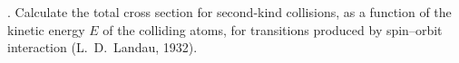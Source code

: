 . Calculate the total cross section for second-kind collisions, as a function of the kinetic energy $E$ of the colliding atoms, for transitions produced by spin--orbit interaction (L.~D.~Landau, 1932).
